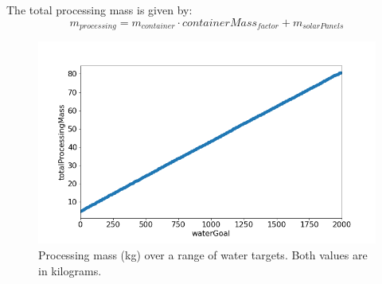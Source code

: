The total processing mass is given by:
\begin{equation}
    m_{processing} = m_{container} \cdot containerMass_{factor} + m_{solarPanels} 
\end{equation}
\begin{figure}[htb]
    \centering
    \includegraphics[width=0.5\linewidth]{processMass_vs_waterGoal.png}
    \captionsetup{justification=centering,margin=2cm}
    \caption{Processing mass (kg) over a range of water targets. Both values are in kilograms.}
    \label{fig-processMass}
\end{figure}
